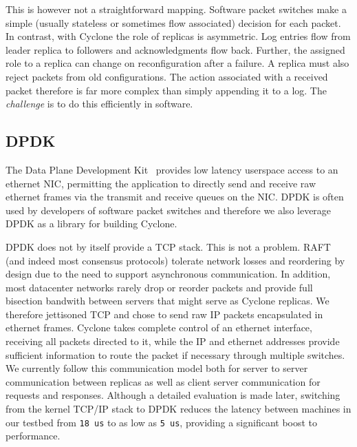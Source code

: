 \documentclass[pageno]{jpaper}
\begin{document}
This is however not a straightforward mapping. Software packet switches make a
simple (usually stateless or sometimes flow associated) decision for each
packet. In contrast, with Cyclone the role of replicas is asymmetric. Log
entries flow from leader replica to followers and acknowledgments flow
back. Further, the assigned role to a replica can change on reconfiguration
after a failure. A replica must also reject packets from old configurations. The
action associated with a received packet therefore is far more complex than
simply appending it to a log.  The \emph{challenge} is to do this efficiently in
software.

\subsection{DPDK}
The Data Plane Development Kit~\cite{dpdk} provides low latency userspace access
to an ethernet NIC, permitting the application to directly send and receive raw
ethernet frames via the transmit and receive queues on the NIC. DPDK is often
used by developers of software packet switches and therefore we also leverage
DPDK as a library for building Cyclone.

DPDK does not by itself provide a TCP stack. This is not a problem. RAFT (and
indeed most consensus protocols) tolerate network losses and reordering by
design due to the need to support asynchronous communication. In addition, most
datacenter networks rarely drop or reorder packets and provide full bisection
bandwith between servers that might serve as Cyclone replicas. We therefore
jettisoned TCP and chose to send raw IP packets encapsulated in ethernet
frames. Cyclone takes complete control of an ethernet interface, receiving all
packets directed to it, while the IP and ethernet addresses provide sufficient
information to route the packet if necessary through multiple switches. We
currently follow this communication model both for server to server
communication between replicas as well as client server communication for
requests and responses. Although a detailed evaluation is made later, switching
from the kernel TCP/IP stack to DPDK reduces the latency between machines in our
testbed from {\tt 18 us} to as low as {\tt 5 us}, providing a significant boost
to performance.
\end{document}

